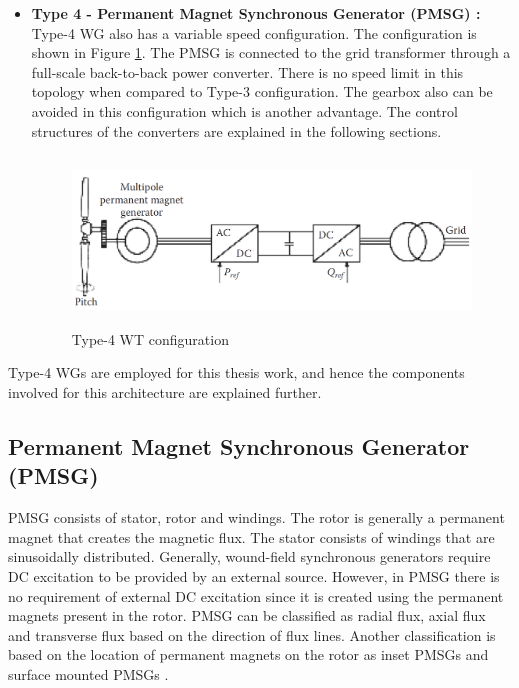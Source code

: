 \begin{itemize}
    \item \textbf{Type 4 - Permanent Magnet Synchronous Generator (PMSG) :} Type-4 \gls{WG} also has a variable speed configuration. 
    The configuration is shown in Figure \ref{fig:Type4}. The PMSG is connected to the grid transformer through a full-scale back-to-back power converter. There is no speed limit in this topology when compared to Type-3 configuration. The gearbox also can be avoided in this configuration which is another advantage. The control structures of the converters are explained in the following sections.
    
\begin{figure}[H]
\centering
    \includegraphics[height = 4.5cm,width = 11.5cm]{Diagrams/Chapter_2/Type4WT_1.png}
    \caption{Type-4 WT configuration \cite{ali_wind_2012}}
    \label{fig:Type4}
\end{figure}
\end{itemize}

Type-4 \gls{WG}s are employed for this thesis work, and hence the components involved for this architecture are explained further.

\subsection{Permanent Magnet Synchronous Generator (PMSG)}\label{PMSG}
\gls{PMSG} consists of stator, rotor and windings. The rotor is generally a permanent magnet that creates the magnetic flux. The stator consists of windings that are sinusoidally distributed. Generally, wound-field synchronous generators require \gls{DC} excitation to be provided by an external source. However, in \gls{PMSG} there is no requirement of external \gls{DC} excitation since it is created using the permanent magnets present in the rotor. \gls{PMSG} can be classified as radial flux, axial flux and transverse flux based on the direction of flux lines. Another classification is based on the location of permanent magnets on the rotor as inset \gls{PMSG}s and surface mounted \gls{PMSG}s \cite{sebastian_transient_1989}.  

